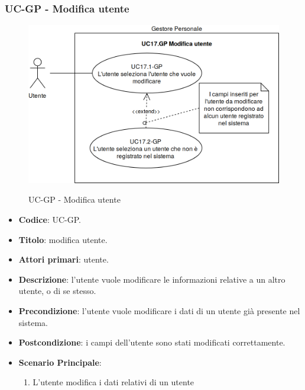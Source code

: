 \subsubsection{UC\theuccount-GP - Modifica utente}
		\begin{figure}[H]
			\centering
				\includegraphics[width=\columnwidth]{img/casi_d'uso/UC17.png}\\
			\caption{UC\theuccount-GP - Modifica utente}
		\end{figure}
	\begin{itemize}
		\item \textbf{Codice}: UC\theuccount-GP.
		\item \textbf{Titolo}: modifica utente.
		\item \textbf{Attori primari}: utente.
		\item \textbf{Descrizione}: l’utente vuole modificare le informazioni relative a un altro utente, o di se stesso.
		\item \textbf{Precondizione}: l'utente vuole modificare i dati di un utente già presente nel sistema.
		\item \textbf{Postcondizione}: i campi dell'utente sono stati modificati correttamente.
		\item \textbf{Scenario Principale}:
		\begin{enumerate}
			\item L'utente modifica i dati relativi di un utente
		\end{enumerate}
	\end{itemize}
	
